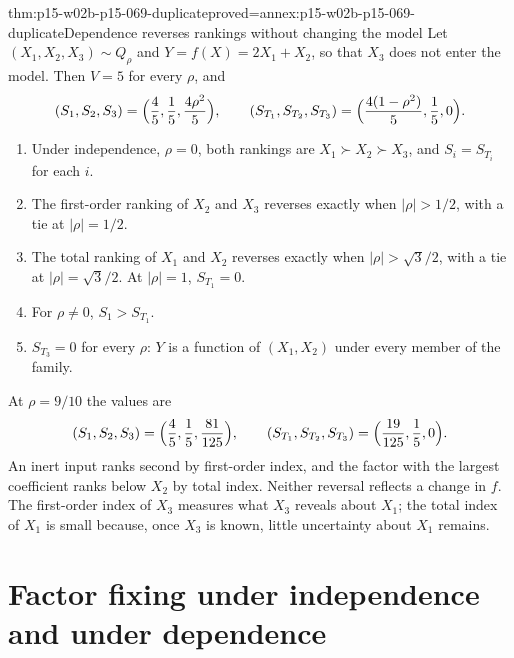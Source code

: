 \begin{hbtheorem}{thm:p15-w02b-p15-069-duplicate}{proved=annex:p15-w02b-p15-069-duplicate}{Dependence reverses rankings without changing the model}
Let \((X_1,X_2,X_3)\sim Q_\rho\) and \(Y=f(X)=2X_1+X_2\), so that
\(X_3\) does not enter the model. Then \(V=5\) for every \(\rho\), and
\[
 (S_1,S_2,S_3)=\Bigl(\frac45,\frac15,\frac{4\rho^2}5\Bigr),\qquad
 (S_{T_1},S_{T_2},S_{T_3})=\Bigl(\frac{4(1-\rho^2)}5,\frac15,0\Bigr).
\]
\begin{enumerate}
\item Under independence, \(\rho=0\), both rankings are
 \(X_1\succ X_2\succ X_3\), and \(S_i=S_{T_i}\) for each \(i\).
\item The first-order ranking of \(X_2\) and \(X_3\) reverses exactly when
 \(|\rho|>1/2\), with a tie at \(|\rho|=1/2\).
\item The total ranking of \(X_1\) and \(X_2\) reverses exactly when
 \(|\rho|>\sqrt3/2\), with a tie at \(|\rho|=\sqrt3/2\). At \(|\rho|=1\),
 \(S_{T_1}=0\).
\item For \(\rho\ne0\), \(S_1>S_{T_1}\).
\item \(S_{T_3}=0\) for every \(\rho\): \(Y\) is a function of
 \((X_1,X_2)\) under every member of the family.
\end{enumerate}
\end{hbtheorem}

At \(\rho=9/10\) the values are
\[
 (S_1,S_2,S_3)=\Bigl(\frac45,\frac15,\frac{81}{125}\Bigr),\qquad
 (S_{T_1},S_{T_2},S_{T_3})=\Bigl(\frac{19}{125},\frac15,0\Bigr).
\]
An inert input ranks second by first-order index, and the factor with the
largest coefficient ranks below \(X_2\) by total index. Neither reversal
reflects a change in \(f\). The first-order index of \(X_3\) measures what
\(X_3\) reveals about \(X_1\); the total index of \(X_1\) is small because,
once \(X_3\) is known, little uncertainty about \(X_1\) remains.

\section{Factor fixing under independence and under dependence}


